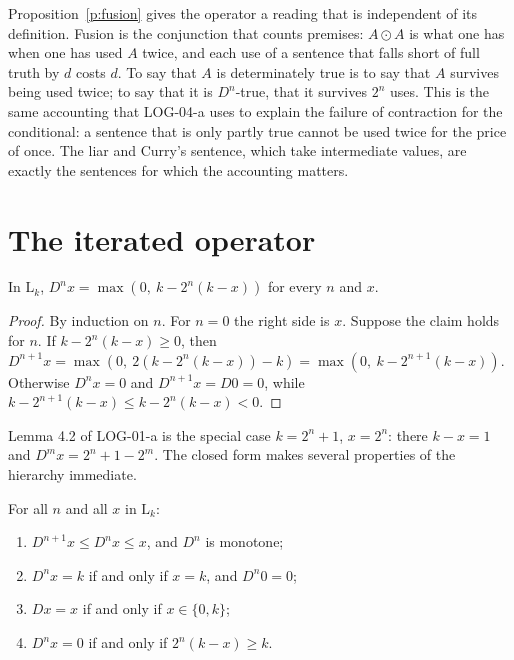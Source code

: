 \documentclass{situationist-preprint}
\begin{document}
Proposition~\ref{p:fusion} gives the operator a reading that is independent of its definition. Fusion is the conjunction that counts premises: $A \odot A$ is what one has when one has used $A$ twice, and each use of a sentence that falls short of full truth by $d$ costs $d$. To say that $A$ is determinately true is to say that $A$ survives being used twice; to say that it is $D^n$-true, that it survives $2^n$ uses. This is the same accounting that LOG-04-a uses to explain the failure of contraction for the conditional: a sentence that is only partly true cannot be used twice for the price of once. The liar and Curry's sentence, which take intermediate values, are exactly the sentences for which the accounting matters.

\section{The iterated operator}

\begin{proposition}\label{p:closed}
In $\mathrm{L}_k$, $D^n x = \max(0,\ k - 2^n(k - x))$ for every $n$ and $x$.
\end{proposition}

\begin{proof}
By induction on $n$. For $n = 0$ the right side is $x$. Suppose the claim holds for $n$. If $k - 2^n(k - x) \geq 0$, then $D^{n+1}x = \max(0,\ 2(k - 2^n(k - x)) - k) = \max(0,\ k - 2^{n+1}(k-x))$. Otherwise $D^n x = 0$ and $D^{n+1} x = D0 = 0$, while $k - 2^{n+1}(k - x) \leq k - 2^n(k-x) < 0$.
\end{proof}

Lemma 4.2 of LOG-01-a is the special case $k = 2^n + 1$, $x = 2^n$: there $k - x = 1$ and $D^m x = 2^n + 1 - 2^m$. The closed form makes several properties of the hierarchy immediate.

\begin{corollary}\label{c:props}
For all $n$ and all $x$ in $\mathrm{L}_k$:
\begin{enumerate}[label=(\alph*)]
\item $D^{n+1}x \leq D^n x \leq x$, and $D^n$ is monotone;
\item $D^n x = k$ if and only if $x = k$, and $D^n 0 = 0$;
\item $Dx = x$ if and only if $x \in \{0, k\}$;
\item $D^n x = 0$ if and only if $2^n(k - x) \geq k$.
\end{enumerate}
\end{corollary}
\end{document}

